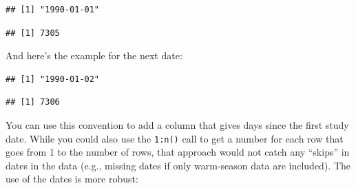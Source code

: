 \documentclass[
]{book}
\newenvironment{Shaded}{\begin{snugshade}}{\end{snugshade}}
\newcommand{\DataTypeTok}[1]{\textcolor[rgb]{0.13,0.29,0.53}{#1}}
\newcommand{\DecValTok}[1]{\textcolor[rgb]{0.00,0.00,0.81}{#1}}
\newcommand{\KeywordTok}[1]{\textcolor[rgb]{0.13,0.29,0.53}{\textbf{#1}}}
\newcommand{\NormalTok}[1]{#1}
\newcommand{\OperatorTok}[1]{\textcolor[rgb]{0.81,0.36,0.00}{\textbf{#1}}}
\newcommand{\StringTok}[1]{\textcolor[rgb]{0.31,0.60,0.02}{#1}}
\begin{document}
\begin{verbatim}
## [1] "1990-01-01"
\end{verbatim}

\begin{Shaded}
\end{Shaded}

\begin{verbatim}
## [1] 7305
\end{verbatim}

And here's the example for the next date:

\begin{Shaded}
\end{Shaded}

\begin{verbatim}
## [1] "1990-01-02"
\end{verbatim}

\begin{Shaded}
\end{Shaded}

\begin{verbatim}
## [1] 7306
\end{verbatim}

You can use this convention to add a column that gives days since the first
study date. While you could also use the \texttt{1:n()} call to get a number for
each row that goes from 1 to the number of rows, that approach would not
catch any ``skips'' in dates in the data (e.g., missing dates if only warm-season
data are included). The use of the dates is more robust:

\begin{Shaded}
\end{Shaded}
\end{document}
